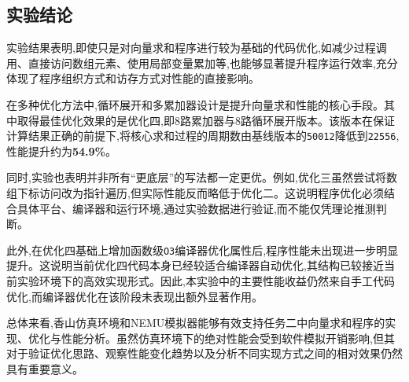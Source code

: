 \subsection{实验结论}
实验结果表明,即使只是对向量求和程序进行较为基础的代码优化,如减少过程调用、直接访问数组元素、使用局部变量累加等,也能够显著提升程序运行效率,充分体现了程序组织方式和访存方式对性能的直接影响。

在多种优化方法中,循环展开和多累加器设计是提升向量求和性能的核心手段。其中取得最佳优化效果的是优化四,即8路累加器与8路循环展开版本。该版本在保证计算结果正确的前提下,将核心求和过程的周期数由基线版本的\texttt{50012}降低到\texttt{22556},性能提升约为\textbf{54.9\%}。

同时,实验也表明并非所有“更底层”的写法都一定更优。例如,优化三虽然尝试将数组下标访问改为指针遍历,但实际性能反而略低于优化二。这说明程序优化必须结合具体平台、编译器和运行环境,通过实验数据进行验证,而不能仅凭理论推测判断。

此外,在优化四基础上增加函数级\texttt{O3}编译器优化属性后,程序性能未出现进一步明显提升。这说明当前优化四代码本身已经较适合编译器自动优化,其结构已较接近当前实验环境下的高效实现形式。因此,本实验中的主要性能收益仍然来自手工代码优化,而编译器优化在该阶段未表现出额外显著作用。

总体来看,香山仿真环境和NEMU模拟器能够有效支持任务二中向量求和程序的实现、优化与性能分析。虽然仿真环境下的绝对性能会受到软件模拟开销影响,但其对于验证优化思路、观察性能变化趋势以及分析不同实现方式之间的相对效果仍然具有重要意义。